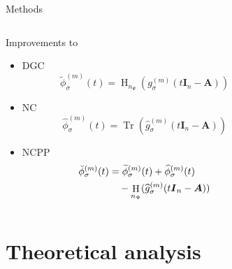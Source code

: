 \documentclass[aspectratio=169, 12pt]{beamer}
\newcommand{\mtx}[1]{\boldsymbol{#1}}
\DeclareMathOperator{\Tr}{Tr}
\DeclareMathOperator{\Hutch}{H}
\begin{document}
\begin{frame}{Methods}
    \begin{columns}
        \begin{column}{0.55\textwidth}
            Improvements to \cite{lin2017randomized}
            \begin{itemize}
                \item \gls{DGC}
                \begin{equation}
                    \widetilde{\phi}_{\sigma}^{(m)}(t) = \Hutch_{n_{\Psi}}(g_{\sigma}^{(m)}(t\mtx{I}_n - \mtx{A}))
                \end{equation}
                \item \gls{NC}
                \begin{equation}
                    \widehat{\phi}_{\sigma}^{(m)}(t) = \Tr(\widehat{g}_{\sigma}^{(m)}(t\mtx{I}_n - \mtx{A}))
                \end{equation}
                \item \gls{NCPP}
                \begin{align}
                    \breve{\phi}_{\sigma}^{(m)}(t) &= \widetilde{\phi}_{\sigma}^{(m)}(t) + \widehat{\phi}_{\sigma}^{(m)}(t) \notag \\
                    &\hspace{10pt}- \Hutch_{n_{\Psi}}(\widehat{g}_{\sigma}^{(m)}(t\mtx{I}_n - \mtx{A}))
                \end{align}
            \end{itemize}
        \end{column}
        \begin{column}{0.45\textwidth}
            \scalebox{0.7}{}
        \end{column}
    \end{columns}
\end{frame}

\section{Theoretical analysis}
\end{document}
